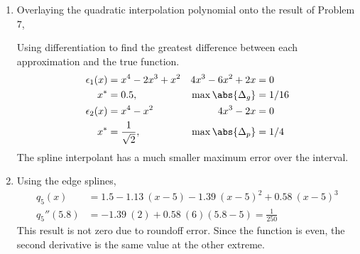 \begin{enumerate}
    \item Overlaying the quadratic interpolation polynomial onto the result of
          Problem $ 7 $,
          \begin{figure}[H]
              \centering
          \end{figure}
          Using differentiation to find the greatest difference between each
          approximation and the true function.
          \begin{align}
              \epsilon_1(x)        & = x^4 - 2x^3 + x^2    &
              4x^3 - 6x^2 + 2x     & = 0                     \\
              x^*                  & = 0.5,                &
              \max{\abs{\Delta_g}} & = 1/16                  \\
              \epsilon_2(x)        & = x^4 - x^2           &
              4x^3 - 2x            & = 0                     \\
              x^*                  & = \frac{1}{\sqrt{2}}, &
              \max{\abs{\Delta_p}} & = 1/4
          \end{align}
          The spline interpolant has a much smaller maximum error over the interval.

    \item Using the edge splines,
          \begin{align}
              q_5(x)     & = 1.5 - 1.13\ (x - 5) - 1 .39\ (x - 5)^2 + 0.58\ (x - 5)^3 \\
              q_5''(5.8) & = -1.39\ (2) + 0.58\ (6)(5.8 - 5) = \frac{1}{250}
          \end{align}
          This result is not zero due to roundoff error. Since the function is even, the
          second derivative is the same value at the other extreme.


\end{enumerate}
